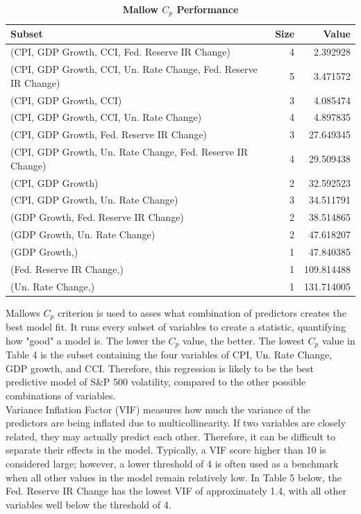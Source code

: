 
\vspace{0.8em}
\begin{table}[H]
\centering
\caption{\textbf{Mallow $C_p$ Performance}}
\vspace{0.8em}
\label{tab:subsets}
\begin{tabular}{lrr}
\hline
Subset & Size & Value \\
\hline
(CPI, GDP Growth, CCI, Fed. Reserve IR Change) & 4 & 2.392928 \\
(CPI, GDP Growth, CCI, Un. Rate Change, Fed. Reserve IR Change) & 5 & 3.471572 \\
(CPI, GDP Growth, CCI) & 3 & 4.085474 \\
(CPI, GDP Growth, CCI, Un. Rate Change) & 4 & 4.897835 \\
(CPI, GDP Growth, Fed. Reserve IR Change) & 3 & 27.649345 \\
(CPI, GDP Growth, Un. Rate Change, Fed. Reserve IR Change) & 4 & 29.509438 \\
(CPI, GDP Growth) & 2 & 32.592523 \\
(CPI, GDP Growth, Un. Rate Change) & 3 & 34.511791 \\
(GDP Growth, Fed. Reserve IR Change) & 2 & 38.514865 \\
(GDP Growth, Un. Rate Change) & 2 & 47.618207 \\
(GDP Growth,) & 1 & 47.840385 \\
(Fed. Reserve IR Change,) & 1 & 109.814488 \\
(Un. Rate Change,) & 1 & 131.714005 \\
\hline
\end{tabular}
\end{table}
\vspace{0.8em}
Mallows $C_p$ criterion is used to asses what combination of predictors creates the best model fit. It runs every subset of variables to create a statistic, quantifying how "good" a model is. The lower the $C_p$ value, the better. The lowest $C_p$ value in Table 4 is the subset containing the four variables of CPI, Un. Rate Change, GDP growth, and CCI. Therefore, this regression is likely to be the best predictive model of S\&P 500 volatility, compared to the other possible combinations of variables. \\
\indent Variance Inflation Factor (VIF) measures how much the variance of the predictors are being inflated due to multicollinearity. If two variables are closely related, they may actually predict each other. Therefore, it can be difficult to separate their effects in the model. Typically, a VIF score higher than 10 is considered large; however, a lower threshold of 4 is often used as a benchmark when all other values in the model remain relatively low. In Table 5 below, the Fed. Reserve IR Change has the lowest VIF of approximately 1.4, with all other variables well below the threshold of 4. 
